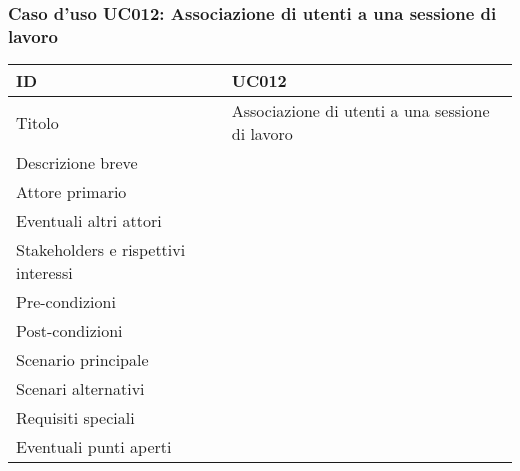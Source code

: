 \documentclass[../../main.tex]{subfiles}
\begin{document}
\subsubsection{Caso d’uso UC012: Associazione di utenti a una sessione di lavoro }
\begin{tabularx}{150mm}{|l|X|}
    \hline
    ID                                  & \textbf{UC012}\\
    \hline
    Titolo                              & Associazione di utenti a una sessione di lavoro \\
    \hline
    Descrizione breve                   &    \\
    \hline
    Attore primario                     &    \\
    \hline
    Eventuali altri attori              &    \\
    \hline
    Stakeholders e rispettivi interessi &    \\
    \hline
    Pre-condizioni                      &    \\
    \hline
    Post-condizioni                     &    \\
    \hline
    Scenario principale                 &    \\
    \hline
    Scenari alternativi                 &    \\
    \hline
    Requisiti speciali                  &    \\
    \hline
    Eventuali punti aperti              &    \\
    \hline
\end{tabularx}
\newpage
\end{document}
